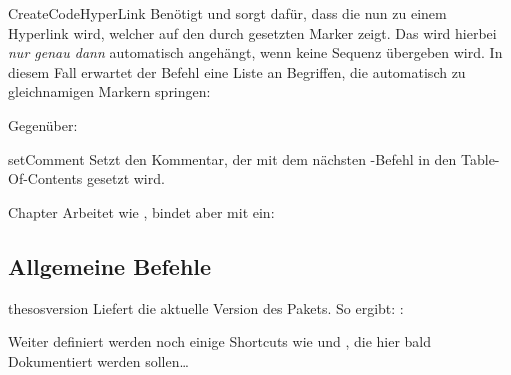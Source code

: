 \documentclass{sopra-base}
\begin{document}
\begin{command}{CreateCodeHyperLink}{}
    Benötigt  und sorgt dafür, dass die  nun zu einem Hyperlink wird, welcher auf den durch \blatex{\\label} gesetzten Marker  zeigt. Das  wird hierbei \emph{nur genau dann} automatisch angehängt, wenn keine  Sequenz übergeben wird. In diesem Fall erwartet der Befehl eine Liste an Begriffen, die automatisch zu gleichnamigen Markern springen:
\begin{plainlatex}[morekeywords={[5]{\\CreateCodeHyperLink}}]
\end{plainlatex}
    Gegenüber:
\begin{plainlatex}[morekeywords={[5]{\\CreateCodeHyperLink}}]
\end{plainlatex}
\end{command}

\begin{command}{setComment}{}
    Setzt den Kommentar, der mit dem nächsten -Befehl in den Table-Of-Contents gesetzt wird.
\end{command}

\begin{command}{Chapter}{}
    Arbeitet wie , bindet aber  mit ein:
\begin{plainlatex}[morekeywords={[5]{\\setComment,\\Chapter}}]
\end{plainlatex}
\end{command}

\subsection{Allgemeine Befehle}

\begin{command}{thesosversion}{}
    Liefert die aktuelle Version des Pakets. So ergibt: : \thesosversion\\
\end{command}

Weiter definiert werden noch einige Shortcuts wie  und , die hier bald Dokumentiert werden sollen\ldots
\end{document}
